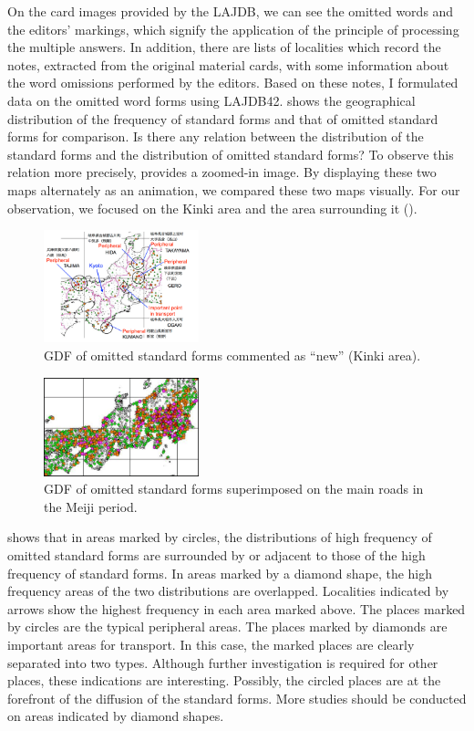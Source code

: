 \documentclass[output=paper]{LSP/langsci}
\begin{document}
On the card images provided by the LAJDB, we can see the omitted words and the editors’ markings, which signify the application of the principle of processing the multiple answers. In addition, there are lists of localities which record the notes, extracted from the original material cards, with some information about the word omissions performed by the editors. Based on these notes, I formulated data on the omitted word forms using LAJDB42.  shows the geographical distribution of the frequency of standard forms and that of omitted standard forms for comparison. Is there any relation between the distribution of the standard forms and the distribution of omitted standard forms? To observe this relation more precisely,  provides a zoomed-in image. By displaying these two maps alternately as an animation, we compared these two maps visually. For our observation, we focused on the Kinki area and the area surrounding it (). 

\begin{figure}
\includegraphics[width=0.4\textwidth]{illustrations/kuma_fig18}
\caption{GDF of omitted standard forms commented as “new” (Kinki area).}          
\label{fig:18}
\end{figure}

\begin{figure}
\includegraphics[width=0.4\textwidth]{illustrations/kuma_fig17-a}
\caption{GDF of omitted standard forms superimposed on the main roads in the Meiji period.}          
\label{fig:19}
\end{figure}             

 shows that in areas marked by circles, the distributions of high frequency of omitted standard forms are surrounded by or adjacent to those of the high frequency of standard forms. In areas marked by a diamond shape, the high frequency areas of the two distributions are overlapped. Localities indicated by arrows show the highest frequency in each area marked above. The places marked by circles are the typical peripheral areas. The places marked by diamonds are important areas for transport. In this case, the marked places are clearly separated into two types. Although further investigation is required for other places, these indications are interesting. Possibly, the circled places are at the forefront of the diffusion of the standard forms. More studies should be conducted on areas indicated by diamond shapes.
\end{document}

